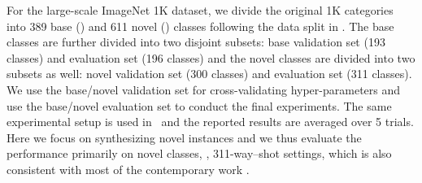 \documentclass[10pt,letterpaper,twocolumn]{article}
\begin{document}
For the large-scale ImageNet 1K dataset, we divide the original
1K categories into 389 base () and 611 novel ()
classes following the data split in \cite{2017ICCVaug}. The base classes are further divided into two disjoint
subsets: base validation set  (193 classes) and
evaluation set  (196 classes) and the novel classes
are divided into two subsets as well: novel validation set 
(300 classes) and evaluation set  (311 classes).
We use the base/novel validation set  for cross-validating
hyper-parameters and use the base/novel evaluation set 
to conduct the final experiments. The same experimental setup is used
in~\cite{2017ICCVaug} and the reported results are averaged over
5 trials. Here we focus on synthesizing novel instances and we thus
evaluate the performance primarily on novel classes, \ie,
311-way--shot settings, which is also consistent with most of the
contemporary work \cite{matchingnet_1shot,prototype_network,Sachin2017}.
\end{document}
